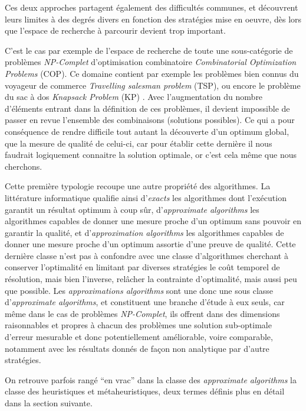 Ces deux approches partagent également des difficultés communes, et découvrent leurs limites à des degrés divers en fonction des stratégies mise en oeuvre, dès lors que l'espace de recherche à parcourir devient trop important.

C'est le cas par exemple de l'espace de recherche de toute une sous-catégorie de problèmes \textit{NP-Complet}  d'optimisation combinatoire \textit{Combinatorial Optimization Problems} (COP). Ce domaine contient par exemple les problèmes bien connus du voyageur de commerce \textit{Travelling salesman problem} (TSP), ou encore le problème du sac à dos \textit{Knapsack Problem} (KP) . Avec l'augmentation du nombre d'éléments entrant dans la définition de ces problèmes, il devient impossible de passer en revue l'ensemble des combinaisons (solutions possibles). Ce qui a pour conséquence de rendre difficile tout autant la découverte d'un optimum global, que la mesure de qualité de celui-ci, car pour établir cette dernière il nous faudrait logiquement connaitre la solution optimale, or c'est cela même que nous cherchons.

Cette première typologie recoupe une autre propriété des algorithmes. La littérature informatique qualifie ainsi d'\textit{exacts} les algorithmes dont l'exécution garantit un résultat optimum à coup sûr, d'\textit{approximate algorithms} les algorithmes capables de donner une mesure proche d'un optimum sans pouvoir en garantir la qualité, et d'\textit{approximation algorithms} les algorithmes capables de donner une mesure proche d'un optimum assortie d'une preuve de qualité. Cette dernière classe n'est pas à confondre avec une classe d'algorithmes cherchant à conserver l'optimalité en limitant par diverses stratégies le coût temporel de résolution, mais bien l'inverse, relâcher la contrainte d'optimalité, mais aussi peu que possible. Les \textit{approximations algorithms} sont une donc une sous classe d'\textit{approximate algorithms}, et constituent une branche d'étude à eux seuls, car même dans le cas de problèmes \textit{NP-Complet}, ils offrent dans des dimensions raisonnables et propres à chacun des problèmes une solution sub-optimale d'erreur mesurable et donc potentiellement améliorable, voire comparable, notamment avec les résultats donnés de façon non analytique par d'autre stratégies.

On retrouve parfois rangé \enquote{en vrac} dans la classe des \textit{approximate algorithms} la classe des heuristiques et métaheuristiques, deux termes définis plus en détail dans la section suivante.

